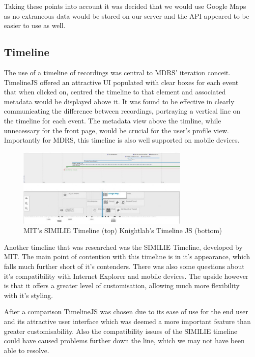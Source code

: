 \documentclass{l3proj}
\begin{document}
Taking these points into account it was decided that we would use Google Maps as no extraneous data would be stored on our server and the API appeared to be easier to use as well.

\subsection{Timeline}
The use of a timeline of recordings was central to MDRS' iteration conceit. TimelineJS offered an attractive UI populated with clear boxes for each event that when clicked on, centred the timeline to that element and associated metadata would be displayed above it. It was found to be effective in clearly communicating the difference between recordings, portraying a vertical line on the timeline for each event. The metadata view above the timline, while unnecessary for the front page, would be crucial for the user's profile view. Importantly for MDRS, this timeline is also well supported on mobile devices.

\begin{figure}[ht!]
  \centering
\includegraphics[width=0.75\textwidth]{images/similie_knightlab_timeline.jpg}
\caption{MIT's SIMILIE Timeline (top) Knightlab's Timeline JS (bottom)}
\end{figure}

Another timeline that was researched was the SIMILIE Timeline, developed by MIT. The main point of contention with this timeline is in it's appearance, which falls much further short of it's contenders. There was also some questions about it's compatibility with Internet Explorer and mobile devices. The upside however is that it offers a greater level of customisation, allowing much more flexibility with it's styling.

After a comparison TimelineJS was chosen due to its ease of use for the end user and its attractive user interface which was deemed a more important feature than greater customisability. Also the compatibility issues of the SIMILIE timeline could have caused problems further down the line, which we may not have been able to resolve.
\end{document}
